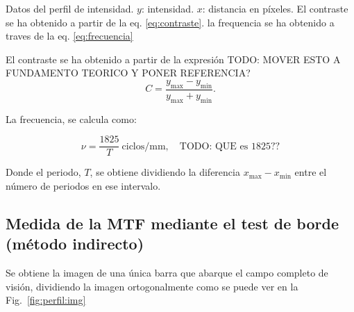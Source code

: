 \documentclass{./packages/optica-article}
\begin{document}
\begin{table}[p]
	\centering
	\caption{Datos del perfil de intensidad. $y$: intensidad. $x$: distancia en píxeles. El contraste se ha obtenido a partir de la eq. \ref{eq:contraste}. la frequencia se ha obtenido a traves de la eq. \ref{eq:frecuencia}}%
	\label{table:perfilintensidad}
\end{table}

El contraste se ha obtenido a partir de la expresión TODO: MOVER ESTO A FUNDAMENTO TEORICO Y PONER REFERENCIA?
\nopagebreak
\begin{equation}
	C = \frac{y_{\max} - y_{\min}}{y_{\max} + y_{\min}}.
	\label{eq:contraste}
\end{equation}

La frecuencia, se calcula como:

\begin{equation}
	\nu = \frac{1825}{T}\ \textrm{ciclos/mm},\quad\textrm{TODO: QUE es 1825??}
	\label{eq:frecuencia}
\end{equation}

Donde el periodo, $T$, se obtiene dividiendo la diferencia $x_{\max} - x_{\min}$ entre el número de periodos en ese intervalo.

\subsection{Medida de la MTF mediante el test de borde (método indirecto)}\label{sec:description:indirecto}

Se obtiene la imagen de una única barra que abarque el campo completo de visión, dividiendo la imagen ortogonalmente como se puede ver en la Fig.~\ref{fig:perfil:img}
\end{document}

